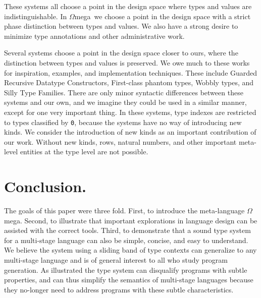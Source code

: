 \documentclass{sigplanconf}
\newcommand{\om}{$\Omega$mega}
\begin{document}
These systems all choose a point in the design space where types and values
are indistinguishable. In \om\ we choose a point in the design space with a
strict phase distinction between types and values. We also have a strong
desire to minimize type annotations and other administrative work.

Several systems choose a point in the design space closer to ours, where the
distinction between types and values is preserved. We owe much to these works
for inspiration, examples, and implementation techniques. These include
Guarded Recursive Datatype Constructors\cite{XiCheChe03}, First-class phantom
types\cite{Hinze:03:Phantom}, Wobbly types\cite{wobbly}, and Silly Type
Families\cite{sillyTF}. There are only minor syntactic differences between
these systems and our own, and we imagine they could be used in a similar
manner, except for one very important thing. In these systems, type indexes
are restricted to types classified by {\tt *0}, because the systems have no
way of introducing new kinds. We consider the introduction of new kinds as an
important contribution of our work. Without new kinds, rows, natural numbers,
and other important meta-level entities at the type level are not possible.

\section{Conclusion.} 

The goals of this paper were three fold. First, to introduce
the meta-language \om. Second, to illustrate that important explorations
in language design can be assisted with the correct tools. Third,
to demonstrate that a sound type system for a multi-stage
language can also be simple, concise, and easy to understand.
We believe the system using a sliding band of type contexts can generalize
to any multi-stage language and is of general interest to all who
study program generation. As illustrated the type system can disqualify
programs with subtle properties, and can thus simplify the semantics
of multi-stage languages because they no-longer need to address programs
with these subtle characteristics.



\end{document}
